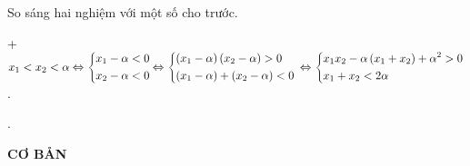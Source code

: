 \begin{dang}{So sáng hai nghiệm với một số cho trước.}
\begin{enumerate}
		+ $x_1<x_2<\alpha \\\Leftrightarrow \left\{{\begin{aligned}&{x_1-\alpha <0} \\ &{x_2-\alpha <0} \\ \end{aligned}\\\Leftrightarrow \left\{{\begin{aligned}&{\left({x_1-\alpha}\right)\left({x_2-\alpha}\right)>0} \\ &{\left({x_1-\alpha}\right)+\left({x_2-\alpha}\right)<0} \\ \end{aligned}}\right.}\right.\Leftrightarrow \left\{{\begin{aligned}&{x_1x_2-\alpha \left({x_1+x_2}\right)+\alpha^2>0} \\ &{x_1+x_2<2\alpha} \\ \end{aligned}}\right.$.\    \end{enumerate}.
\end{dang}

\begin{center}
\noindent \textbf{CƠ BẢN}
\end{center}


